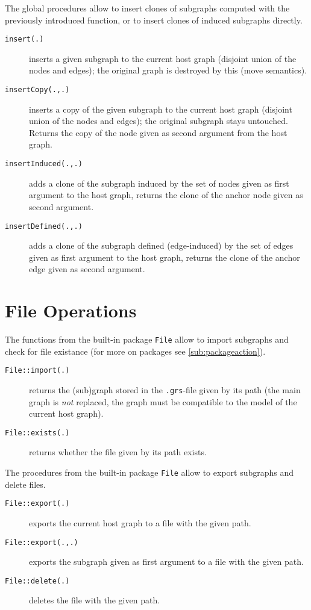 The global procedures allow to insert clones of subgraphs computed with the previously introduced function,
or to insert clones of induced subgraphs directly.

\begin{description}
\item[\texttt{insert(.)}] inserts a given subgraph to the current host graph (disjoint union of the nodes and edges); the original graph is destroyed by this (move semantics).
\item[\texttt{insertCopy(.,.)}] inserts a copy of the given subgraph to the current host graph (disjoint union of the nodes and edges); the original subgraph stays untouched. Returns the copy of the node given as second argument from the host graph.
\item[\texttt{insertInduced(.,.)}] adds a clone of the subgraph induced by the set of nodes given as first argument to the host graph, returns the clone of the anchor node given as second argument.
\item[\texttt{insertDefined(.,.)}] adds a clone of the subgraph defined (edge-induced) by the set of edges given as first argument to the host graph, returns the clone of the anchor edge given as second argument.
\end{description}

\section{File Operations}\label{sec:fileop}

The functions from the built-in package \texttt{File} allow to import subgraphs and check for file existance (for more on packages see \ref{sub:packageaction}).

\begin{description}
\item[\texttt{File::import(.)}] returns the (sub)graph stored in the \texttt{.grs}-file given by its path (the main graph is \emph{not} replaced, the graph must be compatible to the model of the current host graph).
\item[\texttt{File::exists(.)}] returns whether the file given by its path exists.
\end{description}

The procedures from the built-in package \texttt{File} allow to export subgraphs and delete files.

\begin{description}
\item[\texttt{File::export(.)}] exports the current host graph to a file with the given path.
\item[\texttt{File::export(.,.)}] exports the subgraph given as first argument to a file with the given path.
\item[\texttt{File::delete(.)}] deletes the file with the given path.
\end{description}

